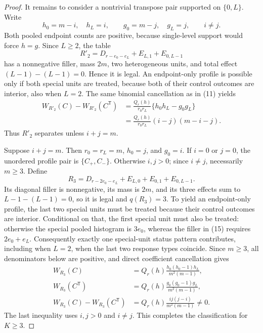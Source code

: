 \documentclass{article}
\begin{document}
\begin{proof}
It remains to consider a nontrivial transpose pair supported on \(\{0,L\}\). Write
\[
 h_0=m-i,\quad h_L=i,\qquad
 g_0=m-j,\quad g_L=j,
 \qquad i\neq j.
 \tag{12}
\]
Both pooled endpoint counts are positive, because single-level support would force \(h=g\). Since \(L\geq2\), the table
\[
 R'_2=D_{r-e_0-e_L}+E_{L,1}+E_{0,L-1}
 \tag{13}
\]
has a nonnegative filler, mass \(2m\), two heterogeneous units, and total effect \((L-1)-(L-1)=0\). Hence it is legal. An endpoint-only profile is possible only if both special units are treated, because both of their control outcomes are interior, also when \(L=2\). The same binomial cancellation as in (11) yields
\[
 \begin{aligned}
 W_{R'_2}(C)-W_{R'_2}(C^{\mathsf T})
 &=\frac{Q_r(h)}{r_0r_L}\{h_0h_L-g_0g_L\}\\
 &=\frac{Q_r(h)}{r_0r_L}(i-j)(m-i-j).
 \end{aligned}
 \tag{14}
\]
Thus \(R'_2\) separates unless \(i+j=m\).

Suppose \(i+j=m\). Then \(r_0=r_L=m\), \(h_0=j\), and \(g_0=i\). If \(i=0\) or \(j=0\), the unordered profile pair is \(\{C_+,C_-\}\). Otherwise \(i,j>0\); since \(i\neq j\), necessarily \(m\geq3\). Define
\[
 R_3=D_{r-2e_0-e_L}+E_{L,0}+E_{0,1}+E_{0,L-1}.
 \tag{15}
\]
Its diagonal filler is nonnegative, its mass is \(2m\), and its three effects sum to \(L-1-(L-1)=0\), so it is legal and \(q(R_3)=3\). To yield an endpoint-only profile, the last two special units must be treated because their control outcomes are interior. Conditional on that, the first special unit must also be treated: otherwise the special pooled histogram is \(3e_0\), whereas the filler in (15) requires \(2e_0+e_L\). Consequently exactly one special-unit status pattern contributes, including when \(L=2\), when the last two response types coincide. Since \(m\geq3\), all denominators below are positive, and direct coefficient cancellation gives
\[
 \begin{aligned}
 W_{R_3}(C)
 &=Q_r(h)\frac{h_0(h_0-1)h_L}{m^2(m-1)},\\
 W_{R_3}(C^{\mathsf T})
 &=Q_r(h)\frac{g_0(g_0-1)g_L}{m^2(m-1)},\\
 W_{R_3}(C)-W_{R_3}(C^{\mathsf T})
 &=Q_r(h)\frac{ij(j-i)}{m^2(m-1)}\neq0.
 \end{aligned}
 \tag{16}
\]
The last inequality uses \(i,j>0\) and \(i\neq j\). This completes the classification for \(K\geq3\).


\end{proof}
\end{document}
